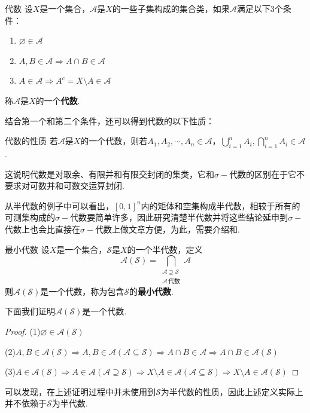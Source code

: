 \begin{definition}{代数}
    设$X$是一个集合，$\mathcal{A}$是$X$的一些子集构成的集合类，如果$\mathcal{A}$满足以下3个条件：
    \begin{enumerate}
        \item $\varnothing\in\mathcal{A}$
        \item $A,B\in\mathcal{A}\Rightarrow A\cap B\in\mathcal{A}$
        \item $A\in\mathcal{A}\Rightarrow A^c=X\setminus A\in\mathcal{A}$
    \end{enumerate}
    称$\mathcal{A}$是$X$的一个\textbf{代数}.
\end{definition}
结合第一个和第二个条件，还可以得到代数的以下性质：
\begin{proposition}{代数的性质}
    若$\mathcal{A}$是$X$的一个代数，则若$A_1,A_2,\cdots,A_n\in\mathcal{A}$，$\bigcup_{i=1}^n{A_i},\bigcap_{i=1}^n{A_i}\in\mathcal{A}$.
\end{proposition}
这说明代数是对取余、有限并和有限交封闭的集类，它和$\sigma-$代数的区别在于它不要求对可数并和可数交运算封闭.\par
从半代数的例子中可以看出，$[0,1]^n$内的矩体和空集构成半代数，相较于所有的可测集构成的$\sigma-\text{代数}$要简单许多，因此研究清楚半代数并将这些结论延申到$\sigma-$代数上也会比直接在$\sigma-$代数上做文章方便，为此，需要介绍和.\par
\begin{definition}{最小代数}
    设$X$是一个集合，$\mathcal{S}$是$X$的一个半代数，定义\[\mathcal{A}(\mathcal{S})=\bigcap_{\substack{\mathcal{A}\supseteq\mathcal{S}\\\mathcal{A}\,\text{代数}}}{\mathcal{A}}\]
    则$\mathcal{A}(\mathcal{S})$是一个代数，称为包含$\mathcal{S}$的\textbf{最小代数}.
\end{definition}
下面我们证明$\mathcal{A}(\mathcal{S})$是一个代数.
\begin{proof}
    (1)$\varnothing\in\mathcal{A}(\mathcal{S})$\par
    (2)$A,B\in\mathcal{A}(\mathcal{S})\Rightarrow A,B\in\mathcal{A}(\mathcal{A}\subseteq\mathcal{S}) \Rightarrow A\cap B\in\mathcal{A}\Rightarrow A\cap B\in\mathcal{A}(\mathcal{S})$\par
    (3)$A\in\mathcal{A}(\mathcal{S})\Rightarrow A\in\mathcal{A}(\mathcal{A}\supseteq\mathcal{S}) \Rightarrow X\setminus A\in\mathcal{A}(\mathcal{A}\subseteq\mathcal{S})\Rightarrow X\setminus A\in\mathcal{A}(\mathcal{S})$
\end{proof}
\begin{remark}
    可以发现，在上述证明过程中并未使用到$\mathcal{S}$为半代数的性质，因此上述定义实际上并不依赖于$\mathcal{S}$为半代数.
\end{remark}
